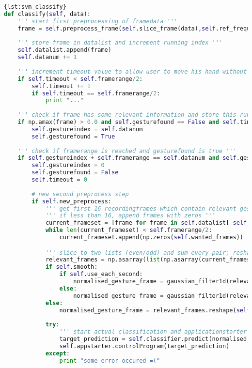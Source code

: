 \begin{lstlisting}[language=Python,caption={Classify},label={lst:svm_classify}]{lst:svm_classify}
def classify(self, data):
	''' start first preprocessing of framedata '''
	frame = self.preprocess_frame(self.slice_frame(data),self.ref_frequency_frame)
	
	''' store frame in datalist and increment running index '''
	self.datalist.append(frame)
	self.datanum += 1
	
	''' increment timeout value to allow user to move his hand without any classification after one gesture '''
	if self.timeout < self.framerange/2:
		self.timeout += 1
		if self.timeout == self.framerange/2:
			print "..."
	
	''' check if frame has some relevant information and store this running index '''
	if np.amax(frame) > 0.0 and self.gesturefound == False and self.timeout == self.framerange/2:
		self.gestureindex = self.datanum
		self.gesturefound = True
		
	''' check if framerange is reached and gesturefound is true '''
	if self.gestureindex + self.framerange == self.datanum and self.gesturefound == True:
		self.gestureindex = 0
		self.gesturefound = False
		self.timeout = 0
		
		# new second preprocess step
		if self.new_preprocess:
			''' get first 16 recordingframes which contain relevant gesture information '''
			''' if less than 16, append frames with zeros '''
			current_frameset = [frame for frame in self.datalist[-self.framerange:] if np.amax(frame) > 0]
			while len(current_frameset) < self.framerange/2:
				current_frameset.append(np.zeros(self.wanted_frames))

			''' slice to two lists (even/odd) and sum every pair; reshape to 1d array '''
			relevant_frames = np.asarray(list(np.asarray(current_frameset[:self.framerange/2:2] ) + np.asarray(current_frameset[1:self.framerange/2:2])))
			if self.smooth:
				if self.use_each_second:
					normalised_gesture_frame = gaussian_filter1d(relevant_frames.reshape(self.wanted_frames*self.framerange/4,), 1.5)[::2]
				else:
					normalised_gesture_frame = gaussian_filter1d(relevant_frames.reshape(self.wanted_frames*self.framerange/4,), 1.5)
			else:
				normalised_gesture_frame = relevant_frames.reshape(self.wanted_frames*self.framerange/4,)
			
			try:
				''' start actual classification and applicationstarter '''
				target_prediction = self.classifier.predict(normalised_gesture_frame)[0]  # only each second?!?
				self.appstarter.controlProgram(target_prediction)
			except:
				print "some error occured =("
			

\end{lstlisting}
